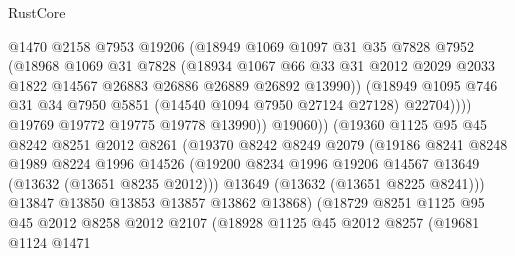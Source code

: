 \begin{lexlean}{RustCore}
\begin{coremodule}
                        @1470
                        @2158
                        @7953
                        @19206
                        (@18949
                          @1069
                          @1097
                          @31
                          @35
                          @7828
                          @7952
                          (@18968
                            @1069
                            @31
                            @7828
                            (@18934
                              @1067
                              @66
                              @33
                              @31
                              @2012
                              @2029
                              @2033
                              @1822
                              @14567
                              @26883
                              @26886
                              @26889
                              @26892
                              @13990))
                          (@18949
                            @1095
                            @746
                            @31
                            @34
                            @7950
                            @5851
                            (@14540 @1094 @7950 @27124 @27128)
                            @22704))))
                    @19769
                    @19772
                    @19775
                    @19778
                    @13990))
                @19060))
            (@19360
              @1125
              @95
              @45
              @8242
              @8251
              @2012
              @8261
              (@19370
                @8242
                @8249
                @2079
                (@19186
                  @8241
                  @8248
                  @1989
                  @8224
                  @1996
                  @14526
                  (@19200 @8234 @1996 @19206 @14567 @13649 (@13632 (@13651 @8235 @2012)))
                  @13649
                  (@13632 (@13651 @8225 @8241)))
                @13847
                @13850
                @13853
                @13857
                @13862
                @13868)
              (@18729
                @8251
                @1125
                @95
                @45
                @2012
                @8258
                @2012
                @2107
                (@18928
                  @1125
                  @45
                  @2012
                  @8257
                  (@19681
                    @1124
                    @1471

\end{coremodule}
\end{lexlean}
